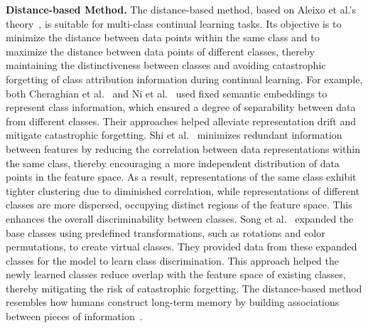 \documentclass[journal,hideappendix]{vgtc}
\newenvironment{j_itemize}{
\begin{itemize}[]
  \setlength{\itemsep}{3pt}
  \setlength{\parskip}{0pt}
  \setlength{\parsep}{0pt}
}{\end{itemize}}
\begin{document}
\begin{j_itemize}
    \item[$\bullet$] \textbf{Distance-based Method.} The distance-based method, based on Aleixo et al.'s theory~\cite{aleixo2023catastrophic}, is suitable for multi-class continual learning tasks. Its objective is to minimize the distance between data points within the same class and to maximize the distance between data points of different classes, thereby maintaining the distinctiveness between classes and avoiding catastrophic forgetting of class attribution information during continual learning. For example, both Cheraghian et al.~\cite{cheraghian2021semantic} and Ni et al.~\cite{ni2024enhancing} used fixed semantic embeddings to represent class information, which ensured a degree of separability between data from different classes. Their approaches helped alleviate representation drift and mitigate catastrophic forgetting. Shi et al.~\cite{shi2022mimicking} minimizes redundant information between features by reducing the correlation between data representations within the same class, thereby encouraging a more independent distribution of data points in the feature space. As a result, representations of the same class exhibit tighter clustering due to diminished correlation, while representations of different classes are more dispersed, occupying distinct regions of the feature space. This enhances the overall discriminability between classes. Song et al.~\cite{song2023learning} expanded the base classes using predefined transformations, such as rotations and color permutations, to create virtual classes. They provided data from these expanded classes for the model to learn class discrimination. This approach helped the newly learned classes reduce overlap with the feature space of existing classes, thereby mitigating the risk of catastrophic forgetting. The distance-based method resembles how humans construct long-term memory by building associations between pieces of information~\cite{shiffrin1969memory,tulving1972episodic}.


\end{j_itemize}
\end{document}
